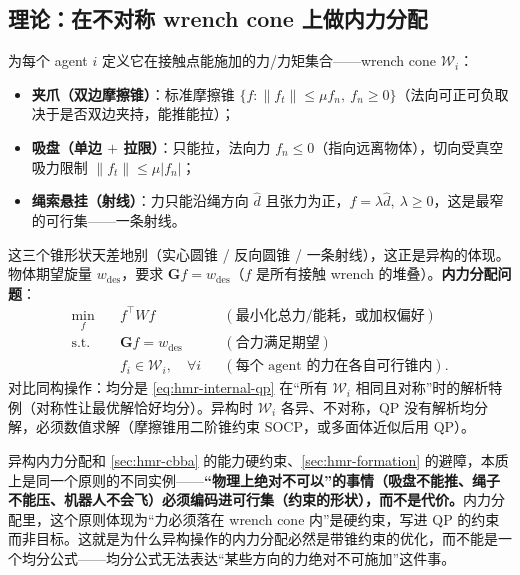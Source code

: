 \subsection{理论：在不对称 wrench cone 上做内力分配}
\label{sec:hmr-manip-qp}
为每个 agent $i$ 定义它在接触点能施加的力/力矩集合——wrench cone $\mathcal{W}_i$：
\begin{itemize}
  \item \textbf{夹爪（双边摩擦锥）}：标准摩擦锥 $\{f:\|f_t\|\le\mu f_n,\ f_n\ge 0\}$（法向可正可负取决于是否双边夹持，能推能拉）；
  \item \textbf{吸盘（单边 $+$ 拉限）}：只能拉，法向力 $f_n\le 0$（指向远离物体），切向受真空吸力限制 $\|f_t\|\le\mu|f_n|$；
  \item \textbf{绳索悬挂（射线）}：力只能沿绳方向 $\hat d$ 且张力为正，$f=\lambda\hat d,\ \lambda\ge 0$，这是最窄的可行集——一条射线。
\end{itemize}
这三个锥形状天差地别（实心圆锥 / 反向圆锥 / 一条射线），这正是异构的体现。物体期望旋量 $w_{\mathrm{des}}$，要求 $\mathbf{G}f=w_{\mathrm{des}}$（$f$ 是所有接触 wrench 的堆叠）。\textbf{内力分配问题}：
\begin{equation}
  \begin{aligned}
  \min_{f}\quad & f^\top W f &&(\text{最小化总力/能耗，或加权偏好})\\
  \mathrm{s.t.}\quad & \mathbf{G}f = w_{\mathrm{des}} &&(\text{合力满足期望})\\
  & f_i \in \mathcal{W}_i,\quad \forall i &&(\text{每个 agent 的力在各自可行锥内}).
  \end{aligned}
  \label{eq:hmr-internal-qp}
\end{equation}
对比同构操作：均分是 \cref{eq:hmr-internal-qp} 在“所有 $\mathcal{W}_i$ 相同且对称”时的解析特例（对称性让最优解恰好均分）。异构时 $\mathcal{W}_i$ 各异、不对称，QP 没有解析均分解，必须数值求解（摩擦锥用二阶锥约束 SOCP，或多面体近似后用 QP）。

\begin{insight}
异构内力分配和 \cref{sec:hmr-cbba} 的能力硬约束、\cref{sec:hmr-formation} 的避障，本质上是同一个原则的不同实例——\textbf{“物理上绝对不可以”的事情（吸盘不能推、绳子不能压、机器人不会飞）必须编码进可行集（约束的形状），而不是代价。}内力分配里，这个原则体现为“力必须落在 wrench cone 内”是硬约束，写进 QP 的约束而非目标。这就是为什么异构操作的内力分配必然是带锥约束的优化，而不能是一个均分公式——均分公式无法表达“某些方向的力绝对不可施加”这件事。
\end{insight}


